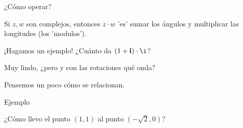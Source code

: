 \documentclass[10pt]{beamer}
\def\ii{\textbf{i}}
\begin{document}
\begin{frame}{¿Cómo operar?}
	
	Si $z,w$ son complejos, entonces $z \cdot w$ 'es' sumar los ángulos y multiplicar las longitudes (los 'modulos'). 
	
	
	
	¡Hagamos un ejemplo! ¿Cuánto da $(1+\ii)\cdot \i$?
	
	   
	   
\end{frame}


\begin{frame}

\Huge{Muy lindo, ¿pero y con las rotaciones qué onda?}

Pensemos un poco cómo se relacionan.



\end{frame}

\begin{frame}{Ejemplo}

¿Cómo llevo el punto $(1,1)$ al punto  $(-\sqrt{2},0)$?



\end{frame}
\end{document}

